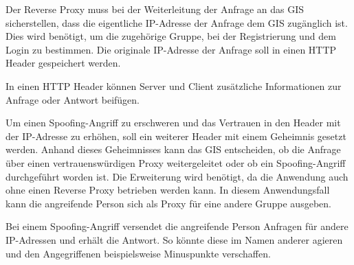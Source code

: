 Der Reverse Proxy muss bei der Weiterleitung der Anfrage an das GIS sicherstellen, dass die eigentliche IP-Adresse der Anfrage dem GIS zugänglich ist. Dies wird benötigt, um die zugehörige Gruppe, bei der Registrierung und dem Login zu bestimmen. Die originale IP-Adresse der Anfrage soll in einen HTTP Header gespeichert werden.

In einen HTTP Header können Server und Client zusätzliche Informationen zur Anfrage oder Antwort beifügen. \cite{mdncontributorsHTTPHeaders2020}

Um einen Spoofing-Angriff zu erschweren und das Vertrauen in den Header mit der IP-Adresse zu erhöhen, soll ein weiterer Header mit einem Geheimnis gesetzt werden. Anhand dieses Geheimnisses kann das GIS entscheiden, ob die Anfrage über einen vertrauenswürdigen Proxy weitergeleitet oder ob ein Spoofing-Angriff durchgeführt worden ist. Die Erweiterung wird benötigt, da die Anwendung auch ohne einen Reverse Proxy betrieben werden kann. In diesem Anwendungsfall kann die angreifende Person sich als Proxy für eine andere Gruppe ausgeben.

Bei einem Spoofing-Angriff versendet die angreifende Person Anfragen für andere IP-Adressen und erhält die Antwort. So könnte diese im Namen anderer agieren und den Angegriffenen beispielsweise Minuspunkte verschaffen.
